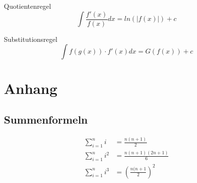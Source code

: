Quotientenregel
\[ \int \frac{f'(x)}{f(x)}dx = ln(|f(x)|) + c\]

Substitutionsregel
\[ \int f(g(x)) \cdot f'(x) dx = G(f(x)) + c\]




\section{Anhang}
\subsection{Summenformeln}
\[ \begin{aligned}
 \sum_{i=1}^{n}i     & = \frac{n(n+1)}{2} \\
 \sum_{i=1}^{n}i^2   & = \frac{n(n+1)(2n+1)}{6} \\
 \sum_{i=1}^{n}i^3   & = \left(\frac{n(n+1}{2}\right)^2 \\
\end{aligned} \]
